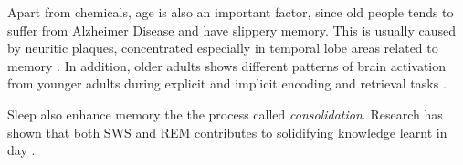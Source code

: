 \documentclass{article}
\begin{document}
Apart from chemicals, age is also an important factor, since old people tends to suffer from Alzheimer Disease and have slippery memory. This is usually caused by neuritic plaques, concentrated especially in temporal lobe areas related to memory \autocite{kolbIntroductionBrainBehavior2019}. In addition, older adults shows different patterns of brain activation from younger adults during explicit and implicit encoding and retrieval tasks \autocite{backmanBrainActivationYoung1997}.

Sleep also enhance memory the the process called \textit{consolidation}. Research has shown that both SWS and REM contributes to solidifying knowledge learnt in day \autocite{diekelmannMemoryFunctionSleep2010}.

\printbibliography{}
\end{document}
